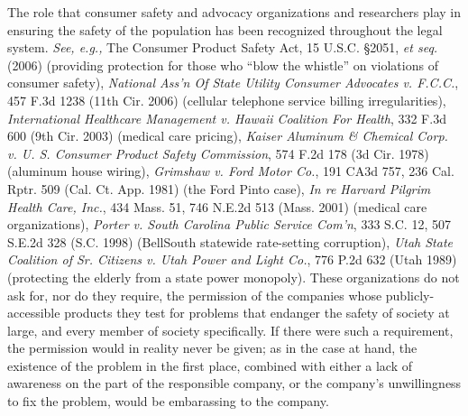 \documentclass{article}
\begin{document}
	The role that consumer safety and advocacy organizations and researchers play in ensuring the safety of the population has been recognized throughout the legal system. \emph{See, e.g.,} 
	The Consumer Product Safety Act, 15 U.S.C. \S2051, \emph{et seq.} (2006) (providing protection for those who ``blow the whistle'' on violations of consumer safety),
	\emph{National Ass'n Of State Utility Consumer Advocates v. F.C.C.}, 457 F.3d 1238 (11th Cir. 2006) (cellular telephone service billing irregularities),
	\emph{International Healthcare Management v. Hawaii Coalition For Health}, 332 F.3d 600 (9th Cir. 2003) (medical care pricing),
	\emph{Kaiser Aluminum \& Chemical Corp. v. U. S. Consumer Product Safety Commission}, 574 F.2d 178 (3d Cir. 1978) (aluminum house wiring),
	\emph{Grimshaw v. Ford Motor Co.}, 191 CA3d 757, 236 Cal. Rptr. 509 (Cal. Ct. App. 1981) (the Ford Pinto case),
	    \emph{In re Harvard Pilgrim Health Care, Inc.}, 434 Mass. 51, 746 N.E.2d 513 (Mass. 2001) (medical care organizations),
			 \emph{Porter v. South Carolina Public Service Com'n}, 333 S.C. 12, 507 S.E.2d 328 (S.C. 1998) (BellSouth statewide rate-setting corruption),
		 \emph{Utah State Coalition of Sr. Citizens v. Utah Power and Light Co.}, 776 P.2d 632 (Utah 1989) (protecting the elderly from a state power monopoly). These organizations do not ask for, nor do they require, the permission of the companies whose publicly-accessible products they test for problems that endanger the safety of society at large, and every member of society specifically. If there were such a requirement, the permission would in reality never be given; as in the case at hand, the existence of the problem in the first place, combined with either a lack of awareness on the part of the responsible company, or the company's unwillingness to fix the problem, would be embarassing to the company.
	
\end{document}
